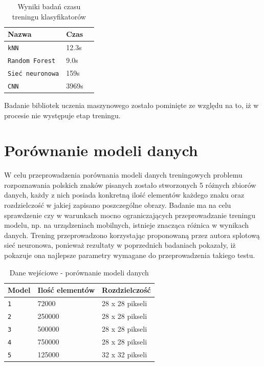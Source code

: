 \documentclass[brudnopis]{xmgr}
\begin{document}
\begin{table}[!htb]
\begin{tabular}{|l|l|l|} \hline
Nazwa & Czas \\ \hline
\texttt{kNN} & 12.3s \\ \hline
\texttt{Random Forest} & 9.0s \\ \hline
\texttt{Sieć neuronowa} & 159s \\ \hline
\texttt{CNN}     & 3969s \\ \hline
\end{tabular}
\caption{Wyniki badań czasu treningu klasyfikatorów}
\end{table}

Badanie bibliotek uczenia maszynowego zostało pominięte ze względu na to, iż w procesie nie występuje etap treningu.

\section{Porównanie modeli danych}

W celu przeprowadzenia porównania modeli danych treningowych problemu rozpoznawania polskich znaków pisanych zostało stworzonych 5 różnych zbiorów danych, każdy z nich posiada konkretną ilość elementów każdego znaku oraz rozdzielczość w jakiej zapisano poszczególne obrazy. Badanie ma na celu sprawdzenie czy w warunkach mocno ograniczających przeprowadzanie treningu modelu, np. na urządzeniach mobilnych, istnieje znacząca różnica w wynikach danych. Trening przeprowadzono korzystając proponowaną przez autora splotową sieć neuronowa, ponieważ rezultaty w poprzednich badaniach pokazały, iż pokazuje ona najlepsze parametry wymagane do przeprowadzenia takiego testu.

\begin{table}[!htb]
\begin{tabular}{|l|l|l|} \hline
Model & Ilość elementów & Rozdzielczość  \\ \hline
\texttt 1 & 72000 & 28 x 28 pikseli \\ \hline
\texttt 2 & 250000 & 28 x 28 pikseli \\ \hline
\texttt 3 & 500000 & 28 x 28 pikseli \\ \hline
\texttt 4 & 750000 & 28 x 28 pikseli \\ \hline
\texttt 5 & 125000 & 32 x 32 pikseli \\ \hline
\end{tabular}
\caption{Dane wejściowe - porównanie modeli danych}
\end{table}
\end{document}
